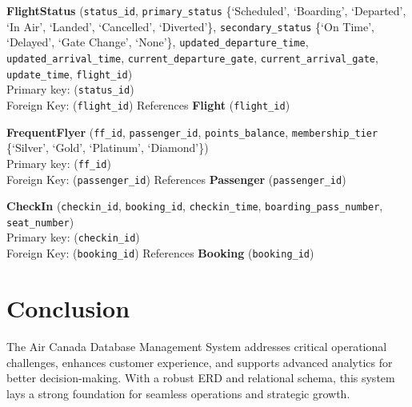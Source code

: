 \documentclass[12pt]{article}
\begin{document}
\vspace{0.3cm}

\noindent\textbf{FlightStatus} (\texttt{status\_id}, \texttt{primary\_status} \{`Scheduled', `Boarding', `Departed', `In Air', `Landed', `Cancelled', `Diverted'\}, \texttt{secondary\_status} \{`On Time', `Delayed', `Gate Change', `None'\}, \texttt{updated\_departure\_time}, \texttt{updated\_arrival\_time}, \texttt{current\_departure\_gate}, \texttt{current\_arrival\_gate}, \texttt{update\_time}, \texttt{flight\_id}) \\
Primary key: (\texttt{status\_id}) \\
Foreign Key: (\texttt{flight\_id}) References \textbf{Flight} (\texttt{flight\_id})

\vspace{0.3cm}

\noindent\textbf{FrequentFlyer} (\texttt{ff\_id}, \texttt{passenger\_id}, \texttt{points\_balance}, \texttt{membership\_tier} \{`Silver', `Gold', `Platinum', `Diamond'\}) \\
Primary key: (\texttt{ff\_id}) \\
Foreign Key: (\texttt{passenger\_id}) References \textbf{Passenger} (\texttt{passenger\_id})

\vspace{0.3cm}

\noindent\textbf{CheckIn} (\texttt{checkin\_id}, \texttt{booking\_id}, \texttt{checkin\_time}, \texttt{boarding\_pass\_number}, \texttt{seat\_number}) \\
Primary key: (\texttt{checkin\_id}) \\
Foreign Key: (\texttt{booking\_id}) References \textbf{Booking} (\texttt{booking\_id})


\section*{Conclusion}
The Air Canada Database Management System addresses critical operational challenges, enhances customer experience, and supports advanced analytics for better decision-making. With a robust ERD and relational schema, this system lays a strong foundation for seamless operations and strategic growth.
\end{document}
